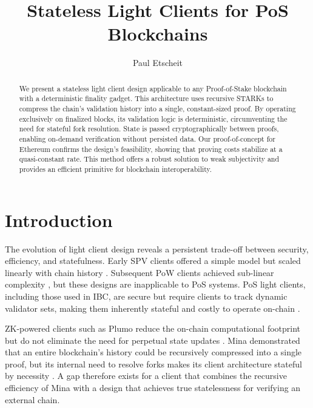 \documentclass[runningheads]{llncs}
\begin{document}
%
\title{Stateless Light Clients for PoS Blockchains}
%
%
\author{Paul Etscheit}
%
%
%
\maketitle              %
%
\begin{abstract}
We present a stateless light client design applicable to any Proof-of-Stake blockchain with a deterministic finality gadget. This architecture uses recursive STARKs to compress the chain's validation history into a single, constant-sized proof. By operating exclusively on finalized blocks, its validation logic is deterministic, circumventing the need for stateful fork resolution. State is passed cryptographically between proofs, enabling on-demand verification without persisted data. Our proof-of-concept for Ethereum confirms the design's feasibility, showing that proving costs stabilize at a quasi-constant rate. This method offers a robust solution to weak subjectivity and provides an efficient primitive for blockchain interoperability.

\end{abstract}
%
%
%
\section{Introduction}
\label{sec:introduction}

The evolution of light client design reveals a persistent trade-off between security, efficiency, and statefulness. Early SPV clients offered a simple model but scaled linearly with chain history \cite{Nakamoto2008Bitcoin}. Subsequent PoW clients achieved sub-linear complexity \cite{Bunz2020FlyClient,Kiayias2020Nipopow}, but these designs are inapplicable to PoS systems. PoS light clients, including those used in IBC, are secure but require clients to track dynamic validator sets, making them inherently stateful and costly to operate on-chain \cite{Goes2020IBC}.

ZK-powered clients such as Plumo reduce the on-chain computational footprint but do not eliminate the need for perpetual state updates \cite{Gabizon2021Plumo}. Mina demonstrated that an entire blockchain's history could be recursively compressed into a single proof, but its internal need to resolve forks makes its client architecture stateful by necessity \cite{Bonneau2020Coda}. A gap therefore exists for a client that combines the recursive efficiency of Mina with a design that achieves true statelessness for verifying an external chain.
\end{document}
